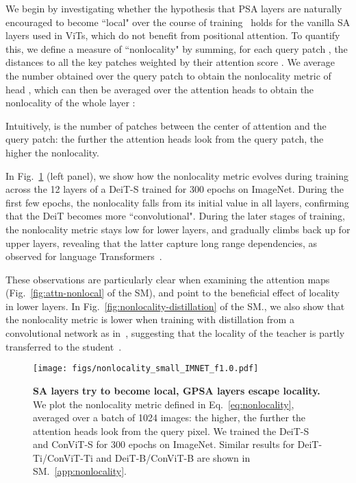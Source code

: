We begin by investigating whether the hypothesis that PSA layers are naturally encouraged to become ``local" over the course of training~\cite{cordonnier2019relationship} holds for the vanilla SA layers used in ViTs, which do not benefit from positional attention. To quantify this, we define a measure of ``nonlocality" by summing, for each query patch , the distances  to all the key patches  weighted by their attention score . We average the number obtained over the query patch to obtain the nonlocality metric of head , which can then be averaged over the attention heads to obtain the nonlocality of the whole layer :

Intuitively,  is the number of patches between the center of attention and the query patch: the further the attention heads look from the query patch, the higher the nonlocality. 

In Fig.~\ref{fig:nonlocality} (left panel), we show how the nonlocality metric evolves during training across the 12 layers of a DeiT-S trained for 300 epochs on ImageNet. During the first few epochs, the nonlocality falls from its initial value in all layers, confirming that the DeiT becomes more ``convolutional". During the later stages of training, the nonlocality metric stays low for lower layers, and gradually climbs back up for upper layers, revealing that the latter capture long range dependencies, as observed for language Transformers~\cite{sukhbaatar2019adaptive}. 

These observations are particularly clear when examining the attention maps (Fig.~\ref{fig:attn-nonlocal} of the SM), and point to the beneficial effect of locality in lower layers. In Fig.~\ref{fig:nonlocality-distillation} of the SM., we also show that the nonlocality metric is lower when training with distillation from a convolutional network as in~\citet{touvron2020training},  suggesting that the locality of the teacher is partly transferred to the student~\cite{abnar2020transferring}.

\begin{figure}[t]
    \centering
    \texttt{[image: figs/nonlocality\_small\_IMNET\_f1.0.pdf]}
    \caption{\textbf{SA layers try to become local, GPSA layers escape locality.} We plot the nonlocality metric defined in Eq.~\ref{eq:nonlocality}, averaged over a batch of 1024 images: the higher, the further the attention heads look from the query pixel. We trained the DeiT-S and ConViT-S for 300 epochs on ImageNet. Similar results for DeiT-Ti/ConViT-Ti and DeiT-B/ConViT-B are shown in SM.~\ref{app:nonlocality}.}
    \label{fig:nonlocality}
\end{figure}


